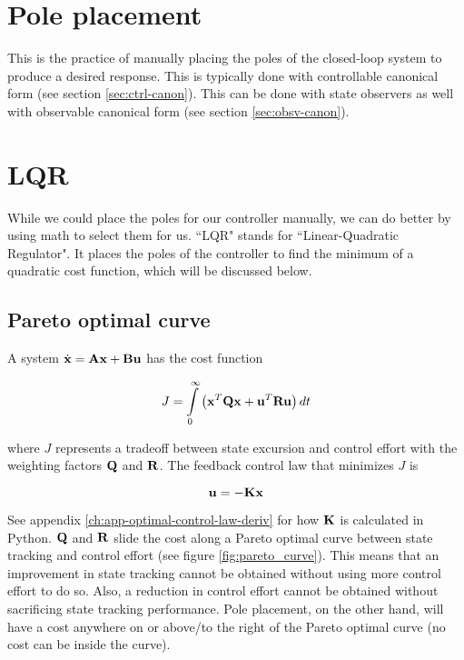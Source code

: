 \section{Pole placement}

This is the practice of manually placing the poles of the closed-loop system to
produce a desired response. This is typically done with controllable canonical
form (see section \ref{sec:ctrl-canon}). This can be done with state observers
as well with observable canonical form (see section \ref{sec:obsv-canon}).

\section{LQR}

While we could place the poles for our controller manually, we can do better by
using math to select them for us. ``LQR" stands for ``Linear-Quadratic
Regulator". It places the poles of the controller to find the minimum of a
quadratic cost function, which will be discussed below.

\subsection{Pareto optimal curve}

A system $\dot{\mathbf{x}} = \mathbf{A}\mathbf{x} + \mathbf{B}\mathbf{u}$ has the cost function

\begin{equation*}
  J = \int\limits_0^\infty \left(\mathbf{x}^T\mathbf{Q}\mathbf{x} +
    \mathbf{u}^T\mathbf{R}\mathbf{u}\right) dt
\end{equation*}

where $J$ represents a tradeoff between \gls{state} excursion and control effort
with the weighting factors $\mathbf{Q}$ and $\mathbf{R}$. The feedback \gls{control
law} that minimizes $J$ is

\begin{equation*}
  \mathbf{u} = -\mathbf{K}\mathbf{x}
\end{equation*}

See appendix \ref{ch:app-optimal-control-law-deriv} for how $\mathbf{K}$ is
calculated in Python. $\mathbf{Q}$ and $\mathbf{R}$ slide the cost along a Pareto
optimal curve between state tracking and control effort (see figure
\ref{fig:pareto_curve}). This means that an improvement in state tracking cannot
be obtained without using more control effort to do so. Also, a reduction in
control effort cannot be obtained without sacrificing state tracking
performance. Pole placement, on the other hand, will have a cost anywhere on or
above/to the right of the Pareto optimal curve (no cost can be inside the
curve).


